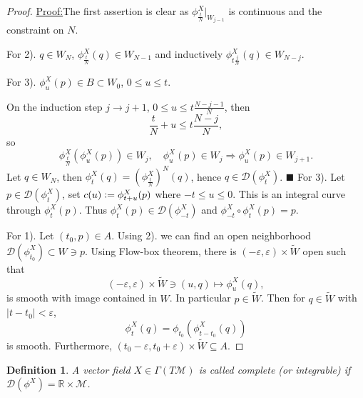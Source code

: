 \documentclass[10pt]{article}
\newtheorem{definition}{Definition}[section]
\newenvironment{claimproof}[1]{\par\noindent\underline{Proof:}\space#1}{\hfill $\blacksquare$}
\newcommand{\defeq}{\vcentcolon=}
\newcommand{\R}[0]{\mathbb{R}}
\newcommand{\M}[0]{\mathcal{M}}
\begin{document}
\begin{proof}
  \begin{claimproof} The first assertion is clear as $\phi_{{\frac t N}}^X|_{W_{j-1}}$ is continuous and the constraint on $N$.
    \par For 2). $q\in W_N$, $\phi^X_{{\frac t N}}(q)\in W_{N-1}$ and inductively $\phi^X_{t{\frac {j} N}}(q)\in W_{N-j}$. \\
    \par For 3). $\phi_u^X(p)\in B\subset W_0$, $0\leq u \leq t$. 
    \par On the induction step $j\to j+1$, $0\leq u\leq t{\frac {N-j-1} N}$, then 
    \begin{equation*}
      {\frac t N}+u\leq t{\frac {N-j} N},
    \end{equation*}
    so 
    \begin{equation*}
      \phi^X_{{\frac t N}}(\phi_u^X(p))\in W_j,\quad \phi_u^X(p)\in W_j\Rightarrow \phi_u^X(p)\in W_{j+1}.
    \end{equation*}
    Let $q\in W_N$, then $\phi_t^X(q) = (\phi^X_{{\frac t N}})^N(q)$, hence $q\in\mathcal{D}(\phi_t^X)$.
  \end{claimproof}
  For 3). Let $p\in\mathcal{D}(\phi_t^X)$, set $c(u)\defeq \phi_{t+u}^X(p)$ where $-t\leq u\leq 0$. This is an integral curve through $\phi_t^X(p)$. Thus $\phi_t^X(p)\in\mathcal{D}(\phi_{-t}^X)$ and $\phi_{-t}^X\circ\phi_{t}^X(p) = p$.\\
  \par For 1). Let $(t_0,p)\in A$. Using 2). we can find an open neighborhood $\mathcal{D}(\phi_{t_0}^X)\subset W\ni p$. Using Flow-box theorem, there is $(-\varepsilon,\varepsilon)\times \tilde{W}$ open such that 
  \begin{equation*}
    (-\varepsilon,\varepsilon)\times \tilde{W}\ni(u,q)\mapsto \phi_u^X(q),
  \end{equation*}
  is smooth with image contained in $W$. In particular $p\in \tilde{W}$. Then for $q\in\tilde{W}$ with $\vert t-t_0\vert<\varepsilon$, 
  \begin{equation*}
    \phi_t^X(q) = \phi_{t_0}(\phi_{t-t_0}^X(q))
  \end{equation*}
  is smooth. Furthermore, $(t_0-\varepsilon,t_0+\varepsilon)\times\tilde{W}\subseteq A$.
\end{proof}

\begin{definition}
A vector field $X\in\Gamma(T\M)$ is called complete  (or integrable) if $\mathcal{D}(\phi^X)=\R\times\M$.
\end{definition}
\end{document}

